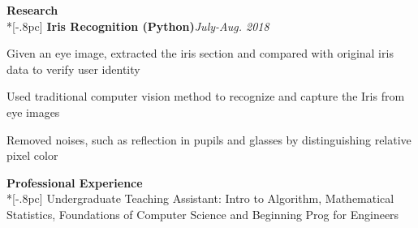 {\large \bf Research} \\*[-.8pc]
\underline{\hspace{7in}} 
{\bf Iris Recognition (Python)}\hfill {\it July-Aug. 2018}\\
\vspace{-4mm}
\begin{list2}
\item Given an eye image, extracted the iris section and compared with original iris data to verify user identity
\item Used traditional computer vision method to recognize and capture the Iris from eye images
\item Removed noises, such as reflection in pupils and glasses by distinguishing relative pixel color\\
\end{list2}


{\large \bf Professional Experience} \\*[-.8pc]
\underline{\hspace{7in}} 
Undergraduate Teaching Assistant:  Intro to Algorithm, Mathematical Statistics, Foundations of Computer Science and Beginning Prog for Engineers \\

